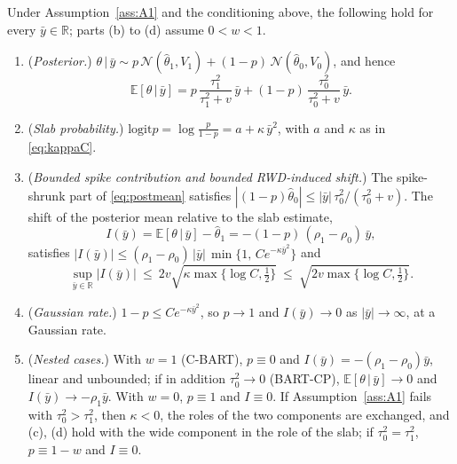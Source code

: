 \documentclass[11pt]{article}
\newcommand{\E}{\mathbb{E}}
\newcommand{\Normal}{\mathcal{N}}
\newcommand{\logit}{\mathrm{logit}}
\newcommand{\given}{\,\vert\,}
\theoremstyle{definition}
\theoremstyle{plain}
\begin{document}
{\begin{thmA}\label{thm:T1}
Under Assumption~\ref{ass:A1} and the conditioning above, the following hold for every $\bar y\in\mathbb R$; parts (b) to (d) assume $0<w<1$.
\begin{enumerate}[label=(\alph*),leftmargin=2.2em]
\item (\emph{Posterior.}) $\theta\given\bar y\sim p\,\Normal(\hat\theta_1,V_1)+(1-p)\,\Normal(\hat\theta_0,V_0)$, and hence
\begin{equation}
\E[\theta\given\bar y]=p\,\frac{\tau_1^2}{\tau_1^2+v}\,\bar y+(1-p)\,\frac{\tau_0^2}{\tau_0^2+v}\,\bar y .
\label{eq:postmean}
\end{equation}
\item (\emph{Slab probability.}) $\displaystyle \logit p=\log\frac{p}{1-p}=a+\kappa\,\bar y^2$, with $a$ and $\kappa$ as in \eqref{eq:kappaC}.
\item (\emph{Bounded spike contribution and bounded RWD-induced shift.}) The spike-shrunk part of \eqref{eq:postmean} satisfies $|(1-p)\hat\theta_0|\le|\bar y|\,\tau_0^2/(\tau_0^2+v)$. The shift of the posterior mean relative to the slab estimate,
\begin{equation}
I(\bar y)=\E[\theta\given\bar y]-\hat\theta_1=-(1-p)\,(\rho_1-\rho_0)\,\bar y ,
\label{eq:I}
\end{equation}
satisfies $|I(\bar y)|\le(\rho_1-\rho_0)\,|\bar y|\,\min\{1,\,Ce^{-\kappa\bar y^2}\}$ and
\begin{equation}
\sup_{\bar y\in\mathbb R}|I(\bar y)|\ \le\ 2v\sqrt{\kappa\max\{\log C,\tfrac12\}}\ \le\ \sqrt{2v\max\{\log C,\tfrac12\}} .
\label{eq:supI}
\end{equation}
\item (\emph{Gaussian rate.}) $1-p\le Ce^{-\kappa\bar y^2}$, so $p\to1$ and $I(\bar y)\to0$ as $|\bar y|\to\infty$, at a Gaussian rate.
\item (\emph{Nested cases.}) With $w=1$ (C-BART), $p\equiv0$ and $I(\bar y)=-(\rho_1-\rho_0)\bar y$, linear and unbounded; if in addition $\tau_0^2\to0$ (BART-CP), $\E[\theta\given\bar y]\to0$ and $I(\bar y)\to-\rho_1\bar y$. With $w=0$, $p\equiv1$ and $I\equiv0$. If Assumption~\ref{ass:A1} fails with $\tau_0^2>\tau_1^2$, then $\kappa<0$, the roles of the two components are exchanged, and (c), (d) hold with the wide component in the role of the slab; if $\tau_0^2=\tau_1^2$, $p\equiv1-w$ and $I\equiv0$.
\end{enumerate}
\end{thmA}

}
\end{document}
